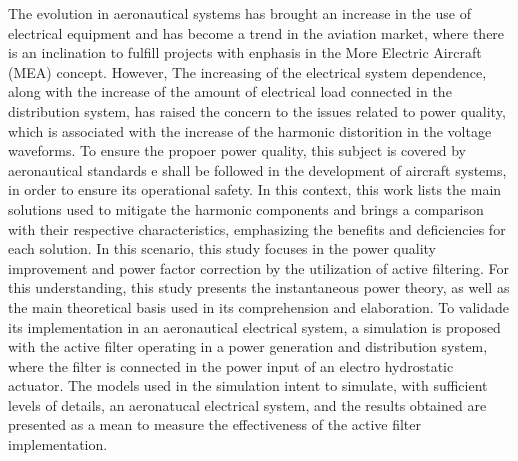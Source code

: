 The evolution in aeronautical systems has brought an increase in the use of electrical equipment and has become a trend in the aviation market, where there is an inclination to fulfill projects with enphasis in the More Electric Aircraft (MEA) concept. However, The increasing of the electrical system dependence, along with the increase of the amount of electrical load connected in the distribution system, has raised the concern to the issues related to power quality, which is associated with the increase of the harmonic distorition in the voltage waveforms. To ensure the propoer power quality, this subject is covered by aeronautical standards e shall be followed in the development of aircraft systems, in order to ensure its operational safety. In this context, this work lists the main solutions used to mitigate the harmonic components and brings a comparison with their respective characteristics, emphasizing the benefits and deficiencies for each solution. In this scenario, this study focuses in the power quality improvement and power factor correction by the utilization of active filtering. For this understanding, this study presents the instantaneous power theory, as well as the main theoretical basis used in its comprehension and elaboration. To validade its implementation in an aeronautical electrical system, a simulation is proposed with the active filter operating in a power generation and distribution system, where the filter is connected in the power input of an electro hydrostatic actuator. The models used in the simulation intent to simulate, with sufficient levels of details, an aeronatucal electrical system, and the results obtained are presented as a mean to measure the effectiveness of the active filter implementation.